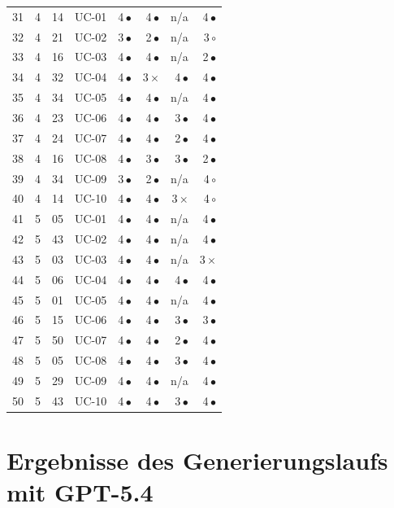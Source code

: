 \begin{longtable}{@{}rrrl rrrr@{}}
\midrule
31 & 4 & 14 & UC-01 & 4\,$\bullet$ & 4\,$\bullet$ & n/a & 4\,$\bullet$ \\
32 & 4 & 21 & UC-02 & 3\,$\bullet$ & 2\,$\bullet$ & n/a & 3\,$\circ$ \\
33 & 4 & 16 & UC-03 & 4\,$\bullet$ & 4\,$\bullet$ & n/a & 2\,$\bullet$ \\
34 & 4 & 32 & UC-04 & 4\,$\bullet$ & 3\,$\times$ & 4\,$\bullet$ & 4\,$\bullet$ \\
35 & 4 & 34 & UC-05 & 4\,$\bullet$ & 4\,$\bullet$ & n/a & 4\,$\bullet$ \\
36 & 4 & 23 & UC-06 & 4\,$\bullet$ & 4\,$\bullet$ & 3\,$\bullet$ & 4\,$\bullet$ \\
37 & 4 & 24 & UC-07 & 4\,$\bullet$ & 4\,$\bullet$ & 2\,$\bullet$ & 4\,$\bullet$ \\
38 & 4 & 16 & UC-08 & 4\,$\bullet$ & 3\,$\bullet$ & 3\,$\bullet$ & 2\,$\bullet$ \\
39 & 4 & 34 & UC-09 & 3\,$\bullet$ & 2\,$\bullet$ & n/a & 4\,$\circ$ \\
40 & 4 & 14 & UC-10 & 4\,$\bullet$ & 4\,$\bullet$ & 3\,$\times$ & 4\,$\circ$ \\
\midrule
41 & 5 & 05 & UC-01 & 4\,$\bullet$ & 4\,$\bullet$ & n/a & 4\,$\bullet$ \\
42 & 5 & 43 & UC-02 & 4\,$\bullet$ & 4\,$\bullet$ & n/a & 4\,$\bullet$ \\
43 & 5 & 03 & UC-03 & 4\,$\bullet$ & 4\,$\bullet$ & n/a & 3\,$\times$ \\
44 & 5 & 06 & UC-04 & 4\,$\bullet$ & 4\,$\bullet$ & 4\,$\bullet$ & 4\,$\bullet$ \\
45 & 5 & 01 & UC-05 & 4\,$\bullet$ & 4\,$\bullet$ & n/a & 4\,$\bullet$ \\
46 & 5 & 15 & UC-06 & 4\,$\bullet$ & 4\,$\bullet$ & 3\,$\bullet$ & 3\,$\bullet$ \\
47 & 5 & 50 & UC-07 & 4\,$\bullet$ & 4\,$\bullet$ & 2\,$\bullet$ & 4\,$\bullet$ \\
48 & 5 & 05 & UC-08 & 4\,$\bullet$ & 4\,$\bullet$ & 3\,$\bullet$ & 4\,$\bullet$ \\
49 & 5 & 29 & UC-09 & 4\,$\bullet$ & 4\,$\bullet$ & n/a & 4\,$\bullet$ \\
50 & 5 & 43 & UC-10 & 4\,$\bullet$ & 4\,$\bullet$ & 3\,$\bullet$ & 4\,$\bullet$ \\
\end{longtable}

\newpage

\section{Ergebnisse des Generierungslaufs mit GPT-5.4}
\label{app:results-gpt}

